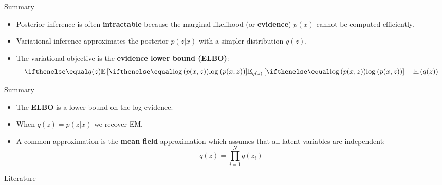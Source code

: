 \documentclass[14pt]{beamer}
\begin{document}
\begin{frame}{Summary}
\begin{itemize}
\item Posterior inference is often \textbf{intractable} because the marginal likelihood (or \textbf{evidence}) 
$ p(x) $ cannot be computed efficiently.
\item Variational inference approximates the posterior $ p(z|x) $ with a simpler distribution $ q(z) $.
\item The variational objective is the \textbf{evidence lower bound (ELBO)}:
\begin{equation*}
\E[q(z)]{\loga{p(x,z)}} + \Ent{q(z)}
\end{equation*}
\end{itemize}
\end{frame}

\begin{frame}{Summary}
\begin{itemize}
\item The \textbf{ELBO} is a lower bound on the log-evidence.
\item When $ q(z) = p(z|x) $ we recover EM.
\item A common approximation is the \textbf{mean field} approximation which assumes that all latent variables
are independent:
\begin{equation*}
q(z) = \prod_{i=1}^{N} q(z_{i})
\end{equation*}
\end{itemize}
\end{frame}

\nocite{BleiEtAl:2016}
\nocite{NealHinton:1998}
\nocite{GhahramaniJordan:1996}
\nocite{BleiEtAl:2003}

\begin{frame}[allowframebreaks]{Literature}

\small

\end{frame}
\end{document}
